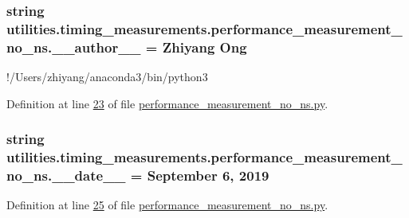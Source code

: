 \subsubsection[{\+\_\+\+\_\+author\+\_\+\+\_\+}]{\setlength{\rightskip}{0pt plus 5cm}string utilities.\+timing\+\_\+measurements.\+performance\+\_\+measurement\+\_\+no\+\_\+ns.\+\_\+\+\_\+author\+\_\+\+\_\+ = \textquotesingle{}Zhiyang Ong\textquotesingle{}}\label{namespaceutilities_1_1timing__measurements_1_1performance__measurement__no__ns_ad21212ef2a99b878f1d71f04b282ee93}


!/\+Users/zhiyang/anaconda3/bin/python3 



Definition at line \hyperlink{performance__measurement__no__ns_8py_source_l00023}{23} of file \hyperlink{performance__measurement__no__ns_8py_source}{performance\+\_\+measurement\+\_\+no\+\_\+ns.\+py}.

\hypertarget{namespaceutilities_1_1timing__measurements_1_1performance__measurement__no__ns_a7b90e234766add970bbe1b7f69e543b9}{}
\subsubsection[{\+\_\+\+\_\+date\+\_\+\+\_\+}]{\setlength{\rightskip}{0pt plus 5cm}string utilities.\+timing\+\_\+measurements.\+performance\+\_\+measurement\+\_\+no\+\_\+ns.\+\_\+\+\_\+date\+\_\+\+\_\+ = \textquotesingle{}September 6, 2019\textquotesingle{}}\label{namespaceutilities_1_1timing__measurements_1_1performance__measurement__no__ns_a7b90e234766add970bbe1b7f69e543b9}


Definition at line \hyperlink{performance__measurement__no__ns_8py_source_l00025}{25} of file \hyperlink{performance__measurement__no__ns_8py_source}{performance\+\_\+measurement\+\_\+no\+\_\+ns.\+py}.

\hypertarget{namespaceutilities_1_1timing__measurements_1_1performance__measurement__no__ns_aad2678d45f225046185eb85ebe3cdc6a}{}
